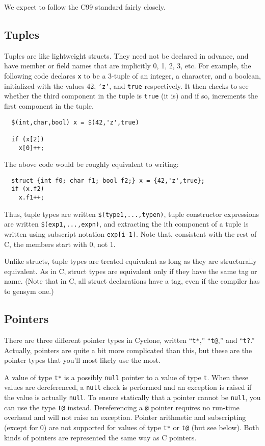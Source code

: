 We expect to follow the C99 standard fairly closely.  


\subsection{Tuples}
Tuples are like lightweight structs.  They need not be declared in
advance, and have member or field names that are implicitly 0, 1, 2,
3, etc.  For example, the following code declares \texttt{x} to be a
3-tuple of an integer, a character, and a boolean, initialized with
the values 42, \texttt{'z'}, and \texttt{true} respectively.  It then
checks to see whether the third component in the tuple is \texttt{true}
(it is) and if so, increments the first component in the tuple.
\begin{verbatim}
  $(int,char,bool) x = $(42,'z',true)

  if (x[2]) 
    x[0]++;
\end{verbatim}

The above code would be roughly equivalent to writing:
\begin{verbatim}
  struct {int f0; char f1; bool f2;} x = {42,'z',true};
  if (x.f2)
    x.f1++;
\end{verbatim}

Thus, tuple types are written \texttt{\$(type1,...,typen)}, tuple
constructor expressions are written \texttt{\$(exp1,...,expn)}, and
extracting the ith component of a tuple is written using subscript
notation \texttt{exp[i-1]}.  Note that, consistent with the rest of C,
the members start with 0, not 1.

Unlike structs, tuple types are treated equivalent as long as they are
structurally equivalent.  As in C, struct types are equivalent only if
they have the same tag or name.  (Note that in C, all struct
declarations have a tag, even if the compiler has to gensym one.)


\subsection{Pointers}
There are three different pointer types in Cyclone, written
``\texttt{t*},'' ``\texttt{t@},'' and ``\texttt{t?}.''  Actually, pointers
are quite a bit more complicated than this, but these are the pointer
types that you'll most likely use the most.

A value of type \texttt{t*} is a possibly \texttt{null} pointer to a
value of type \texttt{t}.  When these values are dereferenced, a
\texttt{null} check is performed and an exception is raised if the
value is actually \texttt{null}. To ensure statically that a pointer
cannot be \texttt{null}, you can use the type \texttt{t@} instead.
Dereferencing a \texttt{@} pointer requires no run-time overhead and
will not raise an exception.  Pointer arithmetic and subscripting
(except for 0) are not supported for values of type \texttt{t*} or
\texttt{t@} (but see below).  Both kinds of pointers are represented
the same way as C pointers.

